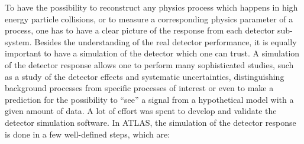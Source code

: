 To have the possibility to reconstruct any physics process which happens in high energy particle collisions, or to measure a corresponding physics parameter of a process,
one has to have a clear picture of the response from each detector sub-system. Besides the understanding of the real detector performance, it is equally important to have 
a simulation of the detector which one can trust. A simulation of the detector response allows one to perform many sophisticated studies, such as a study of the detector effects and systematic uncertainties,
distinguishing background processes from specific processes of interest or even to make a prediction for the possibility to ``see'' a signal from a hypothetical model with a given amount of data.
A lot of effort was spent to develop and validate the detector simulation software. In ATLAS, the simulation of the detector response is done in a few well-defined steps, which are:
